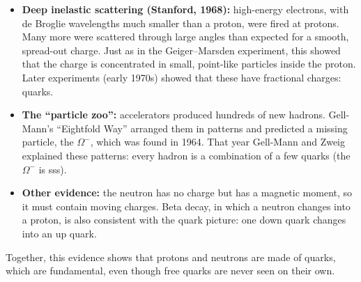 \documentclass[12pt]{article}
\begin{document}
\ansq
\begin{crit}
\end{crit}
\sample
\begin{itemize}
  \item \textbf{Deep inelastic scattering (Stanford, 1968):} high-energy electrons, with de Broglie
        wavelengths much smaller than a proton, were fired at protons. Many more were scattered through
        large angles than expected for a smooth, spread-out charge. Just as in the Geiger--Marsden
        experiment, this showed that the charge is concentrated in small, point-like particles inside the
        proton. Later experiments (early 1970s) showed that these have fractional charges: quarks.
  \item \textbf{The ``particle zoo'':} accelerators produced hundreds of new hadrons. Gell-Mann's
        ``Eightfold Way'' arranged them in patterns and predicted a missing particle, the $\Omega^-$, which
        was found in 1964. That year Gell-Mann and Zweig explained these patterns: every hadron is a
        combination of a few quarks (the $\Omega^-$ is sss).
  \item \textbf{Other evidence:} the neutron has no charge but has a magnetic moment, so it must contain
        moving charges. Beta decay, in which a neutron changes into a proton, is also consistent with the
        quark picture: one down quark changes into an up quark.
\end{itemize}
Together, this evidence shows that protons and neutrons are made of quarks, which are fundamental, even
though free quarks are never seen on their own.
\end{document}
